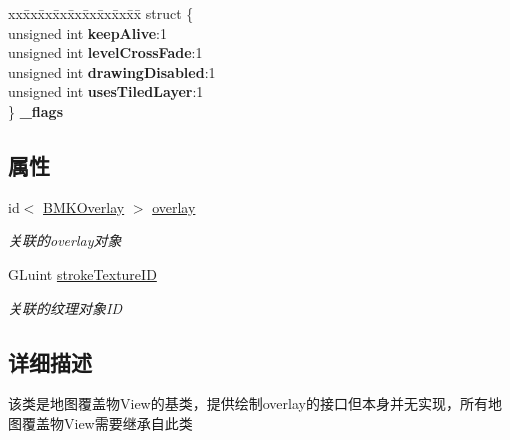 \begin{DoxyCompactItemize}
\item 
\hypertarget{interface_b_m_k_overlay_view_a1b29250fea696a6c7317fe55b0ffe0f5}{}\begin{tabbing}
xx\=xx\=xx\=xx\=xx\=xx\=xx\=xx\=xx\=\kill
struct \{\\
\>unsigned int {\bfseries keepAlive}:1\\
\>unsigned int {\bfseries levelCrossFade}:1\\
\>unsigned int {\bfseries drawingDisabled}:1\\
\>unsigned int {\bfseries usesTiledLayer}:1\\
\} {\bfseries \_flags}\label{interface_b_m_k_overlay_view_a1b29250fea696a6c7317fe55b0ffe0f5}
\\

\end{tabbing}\end{DoxyCompactItemize}
\subsection*{属性}
\begin{DoxyCompactItemize}
\item 
\hypertarget{interface_b_m_k_overlay_view_a0824b78460b0c199376680c7c335d562}{}id$<$ \hyperlink{protocol_b_m_k_overlay-p}{B\+M\+K\+Overlay} $>$ \hyperlink{interface_b_m_k_overlay_view_a0824b78460b0c199376680c7c335d562}{overlay}\label{interface_b_m_k_overlay_view_a0824b78460b0c199376680c7c335d562}

\begin{DoxyCompactList}\small\item\em 关联的overlay对象 \end{DoxyCompactList}\item 
\hypertarget{interface_b_m_k_overlay_view_a160ee62c460e1fa87ccd588f8024e1a9}{}G\+Luint \hyperlink{interface_b_m_k_overlay_view_a160ee62c460e1fa87ccd588f8024e1a9}{stroke\+Texture\+I\+D}\label{interface_b_m_k_overlay_view_a160ee62c460e1fa87ccd588f8024e1a9}

\begin{DoxyCompactList}\small\item\em 关联的纹理对象\+I\+D \end{DoxyCompactList}\end{DoxyCompactItemize}


\subsection{详细描述}
该类是地图覆盖物\+View的基类，提供绘制overlay的接口但本身并无实现，所有地图覆盖物\+View需要继承自此类 

